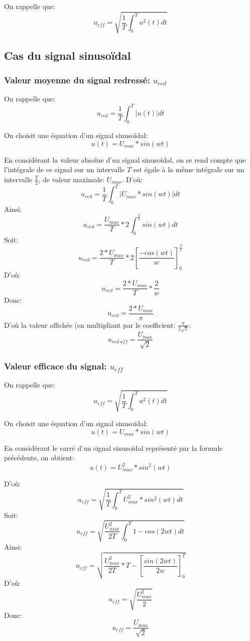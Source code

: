 \documentclass{article}
\begin{document}
On rappelle que: \[ u_{eff}=\sqrt{\frac{1}{T}\int_{0}^{T} u^2(t) dt} \]

\subsection{Cas du signal sinusoïdal}

\subsubsection{Valeur moyenne du signal redressé: $u_{red}$}

On rappelle que: \[ u_{red}=\frac{1}{T}\int_{0}^{T} \left| u(t) \right| dt \]

On choisit une équation d'un signal sinusoïdal: \[ u(t)=U_{max} * sin(wt) \]

En considérant la valeur absolue d'un signal sinusoïdal, on se rend compte que l'intégrale de ce signal sur un intervalle $T$ est égale à la même intégrale sur un intervalle $\frac{T}{2}$, de valeur maximale: $U_{max}$.
D'où: \[ u_{red}=\frac{1}{T}\int_{0}^{T} \left| U_{max} * sin(wt) \right| dt \]
Ainsi: \[ u_{red}=\frac{U_{max}}{T} * 2 \int_{0}^{\frac{T}{2}} sin(wt) dt \]
Soit: \[ u_{red}=\frac{2 * U_{max}}{T} * 2 \left[\frac{-cos(wt)}{w}\right]_0^\frac{T}{2} \]
D'où: \[ u_{red}=\frac{2 * U_{max}}{T} * \frac{2}{w} \]
Donc: \[ u_{red}=\frac{2 * U_{max}}{\pi} \]
D'où la valeur affichée (en multipliant par le coefficient: $\frac{\pi}{2\sqrt2}$: \[ u_{red\ aff}=\frac{U_{max}}{\sqrt2} \]

\subsubsection{Valeur efficace du signal: $u_{eff}$}

On rappelle que: \[ u_{eff}=\sqrt{\frac{1}{T}\int_{0}^{T} u^2(t) dt} \]

On choisit une équation d'un signal sinusoïdal: \[ u(t)=U_{max} * sin(wt) \]

En considérant le carré d'un signal sinusoïdal représenté par la formule précédente, on obtient: \[ u(t)=U_{max}^2 * sin^2(wt) \]

D'où: \[ u_{eff}=\sqrt{\frac{1}{T}\int_{0}^{T} U_{max}^2 * sin^2(wt) dt} \]
Soit: \[ u_{eff}=\sqrt{\frac{U_{max}^2}{2T}\int_{0}^{T} 1 - cos(2wt) dt} \]
Ainsi: \[ u_{eff}=\sqrt{\frac{U_{max}^2}{2T} * T - \left[\frac{sin(2wt)}{2w}\right]_0^T} \]
D'où: \[ u_{eff}=\sqrt{\frac{U_{max}^2}{2}} \]
Donc: \[ u_{eff}=\frac{U_{max}}{\sqrt2} \]
\end{document}

